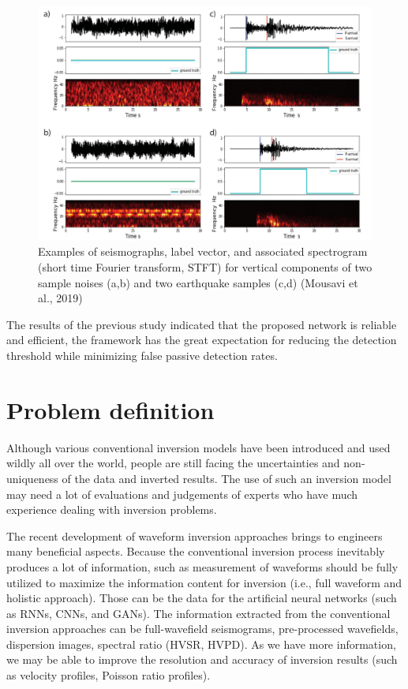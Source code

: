 \begin{figure}
    \centering
    \includegraphics[scale=0.4]{images/seisEX.png}
    \caption{Examples of seismographs, label vector, and associated spectrogram (short time Fourier transform, STFT) for vertical components of two sample noises (a,b) and two earthquake samples (c,d) (Mousavi et al., 2019)}
    \label{fig:seisEX}
\end{figure}

The results of the previous study indicated that the proposed network is reliable and efficient, the framework has the great expectation for reducing the detection threshold while minimizing false passive detection rates. 

\section*{Problem definition}

Although various conventional inversion models have been introduced and used wildly all over the world, people are still facing the uncertainties and non-uniqueness of the data and inverted results. The use of such an inversion model may need a lot of evaluations and judgements of experts who have much experience dealing with inversion problems.

The recent development of waveform inversion approaches brings to engineers many beneficial aspects. Because the conventional inversion process inevitably produces a lot of information, such as measurement of waveforms should be fully utilized to maximize the information content for inversion (i.e., full waveform and holistic approach). Those can be the data for the artificial neural networks (such as RNNs, CNNs, and GANs). The information extracted from the conventional inversion approaches can be full-wavefield seismograms, pre-processed wavefields, dispersion images, spectral ratio (HVSR, HVPD). As we have more information, we may be able to improve the resolution and accuracy of inversion results (such as velocity profiles, Poisson ratio profiles).

